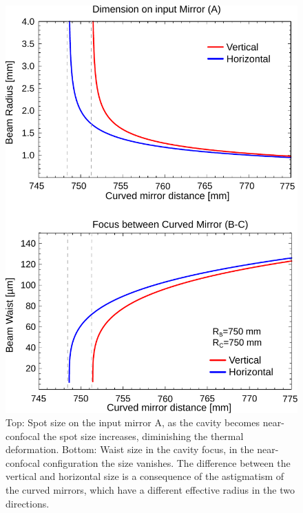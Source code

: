 \begin{figure}
	\centering
	\includegraphics[width=0.9\linewidth]{images/spotdim.pdf}
	\caption{Top: Spot size on the input mirror A, as the cavity becomes near-confocal the spot size increases, diminishing the thermal deformation. Bottom: Waist size in the cavity focus, in the near-confocal configuration the size vanishes. The difference between the vertical and horizontal size is a consequence of the astigmatism of the curved mirrors, which have a different effective radius in the two directions.}
	\label{fig:spotdim}
\end{figure}

